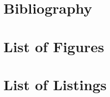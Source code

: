\let\origcleardoublepage\cleardoublepage

\chapter{Bibliography}

\let\cleardoublepage\null
\vspace{-2.6cm}
\printbibliography[title={\ }]
\let\cleardoublepage\origcleardoublepage

\chapter{List of Figures}
\renewcommand{\listfigurename}{}
\let\origcleardoublepage\cleardoublepage
\let\cleardoublepage\null
\vspace{-2.6cm}
\listoffigures
\let\cleardoublepage\origcleardoublepage




\chapter{List of Listings}
\let\origcleardoublepage\cleardoublepage
\let\cleardoublepage\null
\vspace{-2.6cm}
\listoflistingenv
\let\cleardoublepage\origcleardoublepage